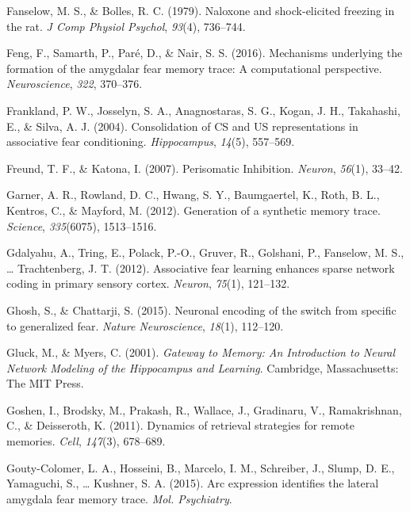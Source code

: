 \documentclass[12pt,a4paperpaper,]{report}
\begin{document}
\hypertarget{ref-fanselowux5fnaloxoneux5f1979}{}
Fanselow, M. S., \& Bolles, R. C. (1979). Naloxone and shock-elicited
freezing in the rat. \emph{J Comp Physiol Psychol}, \emph{93}(4),
736--744.

\hypertarget{ref-fengux5fmechanismsux5f2016}{}
Feng, F., Samarth, P., Paré, D., \& Nair, S. S. (2016). Mechanisms
underlying the formation of the amygdalar fear memory trace: A
computational perspective. \emph{Neuroscience}, \emph{322}, 370--376.

\hypertarget{ref-franklandux5fconsolidationux5f2004-1}{}
Frankland, P. W., Josselyn, S. A., Anagnostaras, S. G., Kogan, J. H.,
Takahashi, E., \& Silva, A. J. (2004). Consolidation of CS and US
representations in associative fear conditioning. \emph{Hippocampus},
\emph{14}(5), 557--569.

\hypertarget{ref-freundux5fperisomaticux5f2007}{}
Freund, T. F., \& Katona, I. (2007). Perisomatic Inhibition.
\emph{Neuron}, \emph{56}(1), 33--42.

\hypertarget{ref-garnerux5fgenerationux5f2012-2}{}
Garner, A. R., Rowland, D. C., Hwang, S. Y., Baumgaertel, K., Roth, B.
L., Kentros, C., \& Mayford, M. (2012). Generation of a synthetic memory
trace. \emph{Science}, \emph{335}(6075), 1513--1516.

\hypertarget{ref-gdalyahuux5fassociativeux5f2012}{}
Gdalyahu, A., Tring, E., Polack, P.-O., Gruver, R., Golshani, P.,
Fanselow, M. S., \ldots{} Trachtenberg, J. T. (2012). Associative fear
learning enhances sparse network coding in primary sensory cortex.
\emph{Neuron}, \emph{75}(1), 121--132.

\hypertarget{ref-ghoshux5fneuronalux5f2015}{}
Ghosh, S., \& Chattarji, S. (2015). Neuronal encoding of the switch from
specific to generalized fear. \emph{Nature Neuroscience}, \emph{18}(1),
112--120.

\hypertarget{ref-gluckux5fgatewayux5f2001}{}
Gluck, M., \& Myers, C. (2001). \emph{Gateway to Memory: An Introduction
to Neural Network Modeling of the Hippocampus and Learning}. Cambridge,
Massachusetts: The MIT Press.

\hypertarget{ref-goshenux5fdynamicsux5f2011}{}
Goshen, I., Brodsky, M., Prakash, R., Wallace, J., Gradinaru, V.,
Ramakrishnan, C., \& Deisseroth, K. (2011). Dynamics of retrieval
strategies for remote memories. \emph{Cell}, \emph{147}(3), 678--689.

\hypertarget{ref-gouty-colomerux5farcux5f2015}{}
Gouty-Colomer, L. A., Hosseini, B., Marcelo, I. M., Schreiber, J.,
Slump, D. E., Yamaguchi, S., \ldots{} Kushner, S. A. (2015). Arc
expression identifies the lateral amygdala fear memory trace. \emph{Mol.
Psychiatry}.
\end{document}
